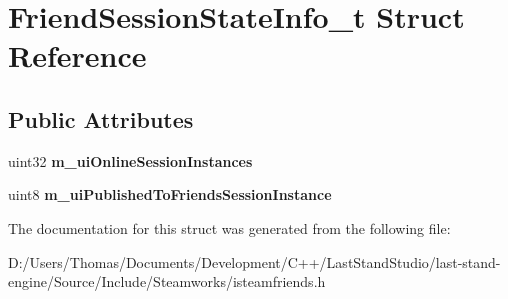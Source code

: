 \hypertarget{structFriendSessionStateInfo__t}{}\section{Friend\+Session\+State\+Info\+\_\+t Struct Reference}
\label{structFriendSessionStateInfo__t}
\subsection*{Public Attributes}
\begin{DoxyCompactItemize}
\item 
\hypertarget{structFriendSessionStateInfo__t_a696907815ec478b5f156089c3e516385}{}uint32 {\bfseries m\+\_\+ui\+Online\+Session\+Instances}\label{structFriendSessionStateInfo__t_a696907815ec478b5f156089c3e516385}

\item 
\hypertarget{structFriendSessionStateInfo__t_a3754f1f10a4f312f44887c07106f0eda}{}uint8 {\bfseries m\+\_\+ui\+Published\+To\+Friends\+Session\+Instance}\label{structFriendSessionStateInfo__t_a3754f1f10a4f312f44887c07106f0eda}

\end{DoxyCompactItemize}


The documentation for this struct was generated from the following file\+:\begin{DoxyCompactItemize}
\item 
D\+:/\+Users/\+Thomas/\+Documents/\+Development/\+C++/\+Last\+Stand\+Studio/last-\/stand-\/engine/\+Source/\+Include/\+Steamworks/isteamfriends.\+h\end{DoxyCompactItemize}
